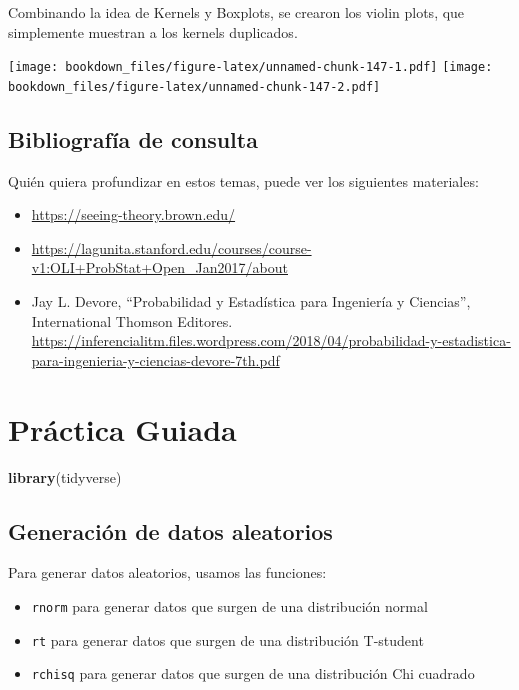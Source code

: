 \documentclass[]{book}
\newenvironment{Shaded}{\begin{snugshade}}{\end{snugshade}}
\newcommand{\KeywordTok}[1]{\textcolor[rgb]{0.13,0.29,0.53}{\textbf{#1}}}
\newcommand{\NormalTok}[1]{#1}
\providecommand{\tightlist}{%
  \setlength{\itemsep}{0pt}\setlength{\parskip}{0pt}}
\begin{document}
Combinando la idea de Kernels y Boxplots, se crearon los violin plots, que simplemente muestran a los kernels duplicados.

\texttt{[image: bookdown\_files/figure-latex/unnamed-chunk-147-1.pdf]} \texttt{[image: bookdown\_files/figure-latex/unnamed-chunk-147-2.pdf]}

\hypertarget{bibliografia-de-consulta-1}{%
\subsection{Bibliografía de consulta}\label{bibliografia-de-consulta-1}}

Quién quiera profundizar en estos temas, puede ver los siguientes materiales:

\begin{itemize}
\tightlist
\item
  \url{https://seeing-theory.brown.edu/}
\item
  \url{https://lagunita.stanford.edu/courses/course-v1:OLI+ProbStat+Open_Jan2017/about}
\item
  Jay L. Devore, ``Probabilidad y Estadística para Ingeniería y Ciencias'', International Thomson Editores. \url{https://inferencialitm.files.wordpress.com/2018/04/probabilidad-y-estadistica-para-ingenieria-y-ciencias-devore-7th.pdf}
\end{itemize}

\hypertarget{practica-guiada-5}{%
\section{Práctica Guiada}\label{practica-guiada-5}}

\begin{Shaded}
\begin{Highlighting}[]
\KeywordTok{library}\NormalTok{(tidyverse)}
\end{Highlighting}
\end{Shaded}

\hypertarget{generacion-de-datos-aleatorios}{%
\subsection{Generación de datos aleatorios}\label{generacion-de-datos-aleatorios}}

Para generar datos aleatorios, usamos las funciones:

\begin{itemize}
\tightlist
\item
  \texttt{rnorm} para generar datos que surgen de una distribución normal
\item
  \texttt{rt} para generar datos que surgen de una distribución T-student
\item
  \texttt{rchisq} para generar datos que surgen de una distribución Chi cuadrado
\end{itemize}
\end{document}
